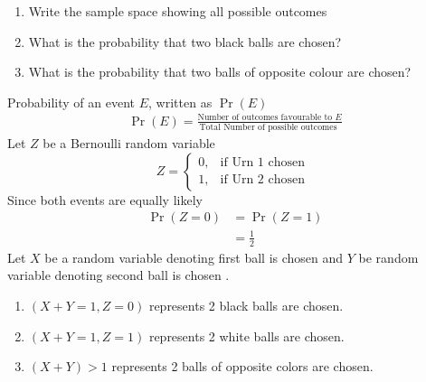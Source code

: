 \documentclass[journal,12pt,twocolumn]{IEEEtran}
\providecommand{\pr}[1]{\ensuremath{\Pr\left(#1\right)}}
\begin{document}
\begin{enumerate}[label=(\alph*)]
\item Write the sample space showing all possible outcomes

\item What is the probability that two black balls are chosen?

\item What is the probability that two balls of opposite colour are chosen?
\end{enumerate}


\solution

Probability of an event $E$, written as $\pr{E}$
\begin{align}
\pr{E}=\displaystyle\frac{\text{Number of outcomes favourable to $E$}}{\text{Total Number of possible outcomes }}
\end{align}
Let $Z$ be a Bernoulli random variable
 \begin{equation}
    Z=
    \begin{cases}
      0, & \text{if Urn 1 chosen }\\
      1, & \text{if Urn 2 chosen}
    \end{cases}
  \end{equation}
  Since both events are equally likely
  \begin{align}
  \pr{Z=0} &= \pr{Z=1}\\
         &=\frac{1}{2}
  \end{align}
Let $X$ be a random variable denoting first ball is chosen and
 $Y$ be random variable denoting second ball is chosen .
 \begin{enumerate}
     \item $(X+Y =1,Z=0) $ represents 2 black balls are chosen.
     \item $(X+Y =1,Z=1) $ represents 2 white balls are chosen.
     \item $ (X+Y) > 1 $ represents 2 balls of opposite colors are chosen.
 \end{enumerate}
 
 

\begin{table}[ht!]
		\centering
		
		\caption{}
		\label{table:table1}	
	\end{table}

\begin{table}[ht!]
		\centering
		
		\caption{}
		\label{table:table2}	
	\end{table}
\end{document}
